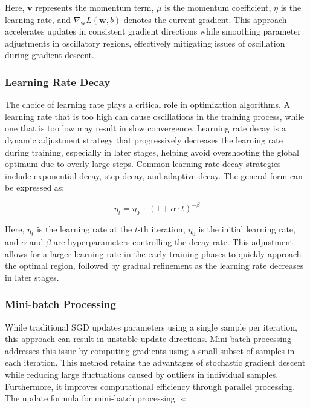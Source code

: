 \documentclass[a4paper, utf8]{ctexart}
\begin{document}
	Here, $\boldsymbol{v}$ represents the momentum term, $\mu$ is the momentum coefficient, $\eta$ is the learning rate, and $\nabla_{\boldsymbol{w}}L(\boldsymbol{w}, b)$ denotes the current gradient. This approach accelerates updates in consistent gradient directions while smoothing parameter adjustments in oscillatory regions, effectively mitigating issues of oscillation during gradient descent.
	
	\subsubsection{Learning Rate Decay}
	
	The choice of learning rate plays a critical role in optimization algorithms. A learning rate that is too high can cause oscillations in the training process, while one that is too low may result in slow convergence. Learning rate decay is a dynamic adjustment strategy that progressively decreases the learning rate during training, especially in later stages, helping avoid overshooting the global optimum due to overly large steps. Common learning rate decay strategies include exponential decay, step decay, and adaptive decay. The general form can be expressed as:
	
	\vspace{-.75em}
	\begin{equation}
		\eta_t = \eta_0 \ \cdot \ (1+\alpha\cdot t)^{-\beta}
	\end{equation}
	 
	Here, $\eta_t$ is the learning rate at the $t$-th iteration, $\eta_0$ is the initial learning rate, and $\alpha$ and $\beta$ are hyperparameters controlling the decay rate. This adjustment allows for a larger learning rate in the early training phases to quickly approach the optimal region, followed by gradual refinement as the learning rate decreases in later stages.
	
	\subsubsection{Mini-batch Processing}
	
	While traditional SGD updates parameters using a single sample per iteration, this approach can result in unstable update directions. Mini-batch processing addresses this issue by computing gradients using a small subset of samples in each iteration. This method retains the advantages of stochastic gradient descent while reducing large fluctuations caused by outliers in individual samples. Furthermore, it improves computational efficiency through parallel processing. The update formula for mini-batch processing is:
	
\end{document}
